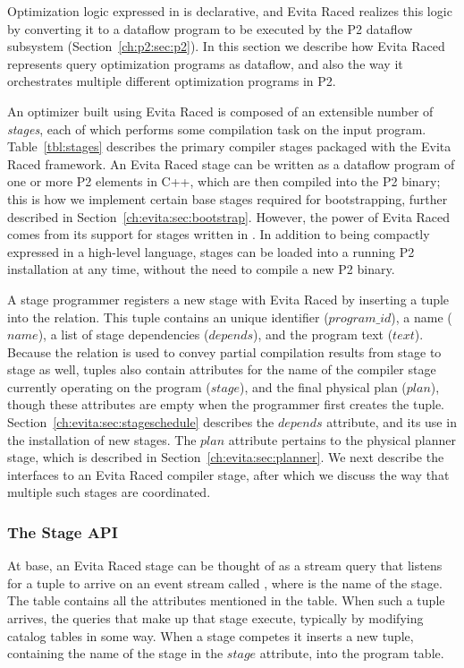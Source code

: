 Optimization logic expressed in \OVERLOG is declarative, and Evita Raced
realizes this logic by converting it to a dataflow program to be executed by
the P2 dataflow subsystem (Section~\ref{ch:p2:sec:p2}).  In this section we
describe how Evita Raced represents query optimization programs as dataflow,
and also the way it orchestrates multiple different optimization programs
in P2.

An optimizer built using Evita Raced is composed of an extensible number of
{\em stages}, each of which performs some compilation task on the input
program.  Table~\ref{tbl:stages} describes the primary compiler stages packaged
with the Evita Raced framework.  An Evita Raced stage can be written as a
dataflow program of one or more P2 elements in C++, which are then compiled
into the P2 binary; this is how we implement certain base stages required for
bootstrapping, further described in Section~\ref{ch:evita:sec:bootstrap}.
However, the power of Evita Raced comes from its support for stages written in
\OVERLOG.  In addition to being compactly expressed in a high-level language,
\OVERLOG stages can be loaded into a running P2 installation at any time,
without the need to compile a new P2 binary.

A stage programmer registers a new stage with Evita Raced by inserting a tuple
into the  relation.  This tuple contains an unique identifier
($program\_id$), a name ($name$), a list of stage dependencies ($depends$), and
the program text ($text$).  Because the  relation is used to convey
partial compilation results from stage to stage as well,  tuples
also contain attributes for the name of the compiler stage currently operating
on the program ($stage$), and the final physical plan ($plan$), though these
attributes are empty when the programmer first creates the tuple.
Section~\ref{ch:evita:sec:stageschedule} describes the $depends$ attribute, and
its use in the installation of new stages.  The $plan$ attribute pertains to
the physical planner stage, which is described in
Section~\ref{ch:evita:sec:planner}.  We next describe the interfaces to an
Evita Raced compiler stage, after which we discuss the way that multiple such
stages are coordinated.

\subsubsection{The Stage API}
\label{ch:evita:sec:stages}

At base, an Evita Raced stage can be thought of as a stream query that listens
for a tuple to arrive on an event stream called ,
where  is the name of the stage.  The 
table contains all the attributes mentioned in the  table.  When
such a tuple arrives, the queries that make up that stage execute, typically by
modifying catalog tables in some way.  When a stage competes it inserts a new
 tuple, containing the name of the stage in the $stage$ attribute,
into the program table.

